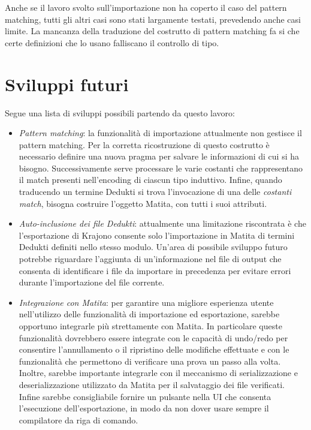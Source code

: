 \documentclass[12pt,a4paper]{mimosis}
\begin{document}
Anche se il lavoro svolto sull'importazione non ha coperto il caso del pattern
matching, tutti gli altri casi sono stati largamente testati, prevedendo anche
casi limite. La mancanza della traduzione del costrutto di pattern matching fa 
si che certe definizioni che lo usano falliscano il controllo di tipo.

\section{Sviluppi futuri}
Segue una lista di sviluppi possibili partendo da questo lavoro:
\begin{itemize}
  \item \textit{Pattern matching}: la funzionalità di importazione attualmente
    non gestisce il pattern matching. Per la corretta ricostruzione di questo
    costrutto è necessario definire una nuova pragma per salvare le informazioni
    di cui si ha bisogno. Successivamente serve processare le varie costanti che
    rappresentano il match presenti nell'encoding di ciascun tipo induttivo.
    Infine, quando traducendo un termine Dedukti si trova l'invocazione di una
    delle \textit{costanti match}, bisogna costruire l'oggetto Matita, con tutti
    i suoi attributi.
  \item \textit{Auto-inclusione dei file Dedukti}: attualmente una limitazione
    riscontrata è che l'esportazione di Krajono consente solo l'importazione in
    Matita di termini Dedukti definiti nello stesso modulo. Un'area di possibile
    sviluppo futuro potrebbe riguardare l'aggiunta di un'informazione nel file
    di output che consenta di identificare i file da importare in precedenza per
    evitare errori durante l'importazione del file corrente.
  \item \textit{Integrazione con Matita}: per garantire una migliore esperienza
    utente nell'utilizzo delle funzionalità di importazione ed esportazione,
    sarebbe opportuno integrarle più strettamente con Matita. In particolare
    queste funzionalità dovrebbero essere integrate con le capacità di undo/redo
    per consentire l'annullamento o il ripristino delle modifiche effettuate e
    con le funzionalità che permettono di verificare una prova un passo alla volta.
    Inoltre, sarebbe importante integrarle con il meccanismo di serializzazione 
    e deserializzazione utilizzato da Matita per il salvataggio dei file verificati.
    Infine sarebbe consigliabile fornire un pulsante nella UI che consenta
    l'esecuzione dell'esportazione, in modo da non dover usare sempre 
    il compilatore da riga di comando. 
\end{itemize}
\end{document}
